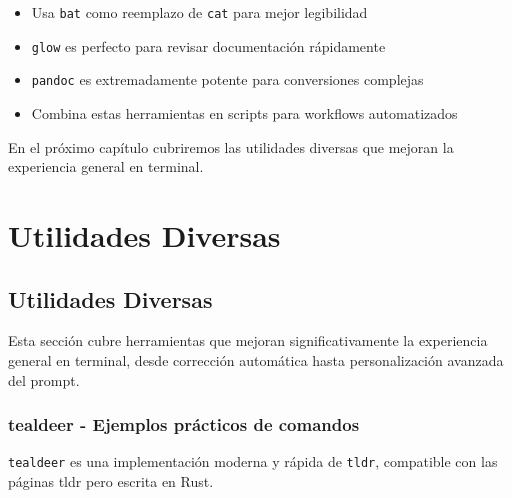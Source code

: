 \documentclass[
  11pt,
  letterpaper,
  oneside,
  openany]{scrbook}
\providecommand{\tightlist}{%
  \setlength{\itemsep}{0pt}\setlength{\parskip}{0pt}}
\begin{document}
\begin{tcolorbox}[enhanced jigsaw, coltitle=black, breakable, arc=.35mm, toprule=.15mm, colbacktitle=quarto-callout-tip-color!10!white, colframe=quarto-callout-tip-color-frame, opacityback=0, colback=white, bottomtitle=1mm, bottomrule=.15mm, rightrule=.15mm, left=2mm, toptitle=1mm, leftrule=.75mm, title=\textcolor{quarto-callout-tip-color}{\faLightbulb}\hspace{0.5em}{Tips para documentación}, titlerule=0mm, opacitybacktitle=0.6]

\begin{itemize}
\tightlist
\item
  Usa \texttt{bat} como reemplazo de \texttt{cat} para mejor legibilidad
\item
  \texttt{glow} es perfecto para revisar documentación rápidamente
\item
  \texttt{pandoc} es extremadamente potente para conversiones complejas
\item
  Combina estas herramientas en scripts para workflows automatizados
\end{itemize}

\end{tcolorbox}

En el próximo capítulo cubriremos las utilidades diversas que mejoran la
experiencia general en terminal.

\part{Utilidades Diversas}

\chapter{Utilidades Diversas}\label{utilidades-diversas-3}

Esta sección cubre herramientas que mejoran significativamente la
experiencia general en terminal, desde corrección automática hasta
personalización avanzada del prompt.

\section{tealdeer - Ejemplos prácticos de comandos}\label{sec-tealdeer}

\texttt{tealdeer} es una implementación moderna y rápida de
\texttt{tldr}, compatible con las páginas tldr pero escrita en Rust.
\end{document}
